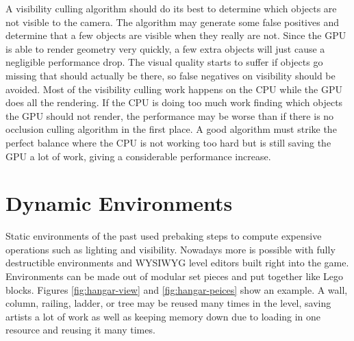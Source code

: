 \documentclass[12pt]{ucthesis}
\begin{document}
A visibility culling algorithm should do its best to determine which objects are not visible to the camera.
The algorithm may generate some false positives and determine that a few objects are visible when they really are not.
Since the GPU is able to render geometry very quickly, a few extra objects will just cause a negligible performance drop.\cite{large-occluders}
The visual quality starts to suffer if objects go missing that should actually be there, so false negatives on visibility should be avoided.
Most of the visibility culling work happens on the CPU while the GPU does all the rendering.
If the CPU is doing too much work finding which objects the GPU should not render, the performance may be worse than if there is no occlusion culling algorithm in the first place.
A good algorithm must strike the perfect balance where the CPU is not working too hard but is still saving the GPU a lot of work, giving a considerable performance increase.

\section{Dynamic Environments}
\label{dynamic-environments}

Static environments of the past used prebaking steps to compute expensive operations such as lighting and visibility.
Nowadays more is possible with fully destructible environments and WYSIWYG level editors built right into the game.
Environments can be made out of modular set pieces and put together like Lego blocks.
Figures \ref{fig:hangar-view} and \ref{fig:hangar-peices} show an example.
A wall, column, railing, ladder, or tree may be reused many times in the level, saving artists a lot of work as well as keeping memory down due to loading in one resource and reusing it many times.
\end{document}
